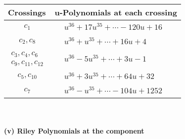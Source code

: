 \documentclass[1p]{elsarticle_modified}
\theoremstyle{definition}
\begin{document}
\begin{tabular}{m{50pt}|m{274pt}}
Crossings & \hspace{64pt}u-Polynomials at each crossing \\
\hline $$\begin{aligned}c_{1}\end{aligned}$$&$\begin{aligned}
&u^{36}+17 u^{35}+\cdots-120 u+16
\end{aligned}$\\
\hline $$\begin{aligned}c_{2},c_{8}\end{aligned}$$&$\begin{aligned}
&u^{36}+u^{35}+\cdots+16 u+4
\end{aligned}$\\
\hline $$\begin{aligned}c_{3},c_{4},c_{6}\\c_{9},c_{11},c_{12}\end{aligned}$$&$\begin{aligned}
&u^{36}-5 u^{35}+\cdots+3 u-1
\end{aligned}$\\
\hline $$\begin{aligned}c_{5},c_{10}\end{aligned}$$&$\begin{aligned}
&u^{36}+3 u^{35}+\cdots+64 u+32
\end{aligned}$\\
\hline $$\begin{aligned}c_{7}\end{aligned}$$&$\begin{aligned}
&u^{36}- u^{35}+\cdots-104 u+1252
\end{aligned}$\\
\hline
\end{tabular}\\~\\
\newpage\renewcommand{\arraystretch}{1}
\flushleft \textbf{(v) Riley Polynomials at the component}\newline \\
\end{document}
